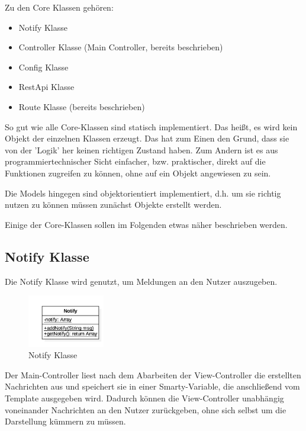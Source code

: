 \pm

Zu den Core Klassen gehören:

\begin{itemize}
	\item Notify Klasse
	\item Controller Klasse (Main Controller, bereits beschrieben)
	\item Config Klasse
	\item RestApi Klasse
	\item Route Klasse (bereits beschrieben)
\end{itemize}
	

So gut wie alle Core-Klassen sind statisch implementiert. Das heißt, es wird kein Objekt der einzelnen Klassen erzeugt. Das hat zum Einen den Grund, dass sie von der 'Logik' her keinen richtigen Zustand haben. Zum Andern ist es aus programmiertechnischer Sicht einfacher, bzw. praktischer, direkt auf die Funktionen zugreifen zu können, ohne auf ein Objekt angewiesen zu sein.

\pm

 Die Models hingegen sind objektorientiert implementiert, d.h. um sie richtig nutzen zu können müssen zunächst Objekte erstellt werden.

\pm

Einige der Core-Klassen sollen im Folgenden etwas näher beschrieben werden.

\subsection{Notify Klasse}

Die Notify Klasse wird genutzt, um Meldungen an den Nutzer auszugeben.

\begin{figure}[h!]
		\centering
        \includegraphics[width=0.3\textwidth]{./Includes/Software/Notify.png}
    \caption{Notify Klasse}
\end{figure}

Der Main-Controller liest nach dem Abarbeiten der View-Controller die erstellten Nachrichten aus und speichert sie in einer Smarty-Variable, die anschließend vom Template ausgegeben wird. Dadurch können die View-Controller unabhängig voneinander Nachrichten an den Nutzer zurückgeben, ohne sich selbst um die Darstellung kümmern zu müssen.

